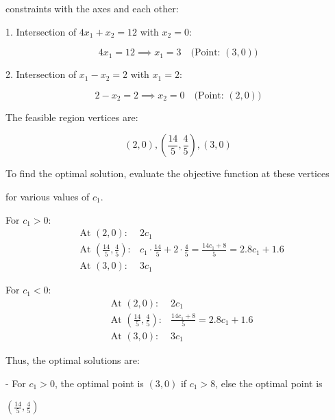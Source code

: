 \documentclass{article}
\begin{document}
constraints with the axes and each other:

\vspace{\baselineskip}

1. Intersection of \( 4x_1 + x_2 = 12 \) with \( x_2 = 0 \):

\[
4x_1 = 12 \implies x_1 = 3 \quad \text{(Point: } (3, 0))
\]

2. Intersection of \( x_1 - x_2 = 2 \) with \( x_1 = 2 \):

\[
2 - x_2 = 2 \implies x_2 = 0 \quad \text{(Point: } (2, 0))
\]

The feasible region vertices are:

\[
(2, 0), \left( \frac{14}{5}, \frac{4}{5} \right), (3, 0)
\]


To find the optimal solution, evaluate the objective function at these vertices 

for various values of \( c_1 \).

\vspace{\baselineskip}

For \( c_1 > 0 \):
\[
\begin{aligned}
&\text{At } (2, 0): & 2c_1 \\
&\text{At } \left( \frac{14}{5}, \frac{4}{5} \right): & c_1 \cdot \frac{14}{5} + 2 \cdot \frac{4}{5} = \frac{14c_1 + 8}{5} = 2.8c_1 + 1.6 \\
&\text{At } (3, 0): & 3c_1
\end{aligned}
\]

\vspace{\baselineskip}

For \( c_1 < 0 \):
\[
\begin{aligned}
&\text{At } (2, 0): & 2c_1 \\
&\text{At } \left( \frac{14}{5}, \frac{4}{5} \right): & \frac{14c_1 + 8}{5} = 2.8c_1 + 1.6 \\
&\text{At } (3, 0): & 3c_1
\end{aligned}
\]

\vspace{\baselineskip}

Thus, the optimal solutions are:

\vspace{\baselineskip}

- For \( c_1 > 0 \), the optimal point is \( (3, 0) \) if \(c_1 > 8\), else the optimal point is 

\( (\frac{14}{5}, \frac{4}{5}) \)

\vspace{\baselineskip}
\end{document}
